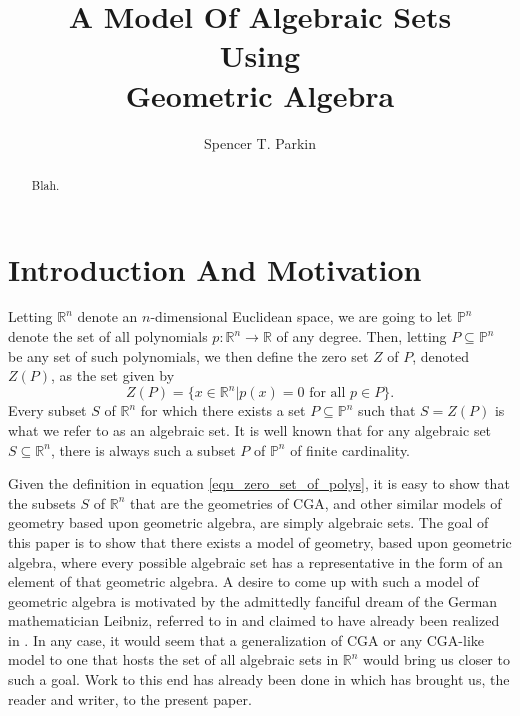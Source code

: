 \documentclass{birkjour}
\theoremstyle{definition}
\theoremstyle{remark}
\numberwithin{equation}{section}
\newcommand{\R}{\mathbb{R}}
\newcommand{\Poly}{\mathbb{P}}
\begin{document}
\title{A Model Of Algebraic Sets\\Using\\Geometric Algebra}

\author{Spencer T. Parkin}





\begin{abstract}
Blah.
\end{abstract}

\maketitle

\section{Introduction And Motivation}

Letting $\R^n$ denote an $n$-dimensional Euclidean space, we are
going to let $\Poly^n$ denote the set of all polynomials $p:\R^n\to\R$
of any degree.  Then, letting $P\subseteq\Poly^n$ be any set of such
polynomials, we then define the zero set $Z$ of $P$, denoted $Z(P)$,
as the set given by
\begin{equation}\label{equ_zero_set_of_polys}
Z(P) = \{x\in\R^n|\mbox{$p(x)=0$ for all $p\in P$}\}.
\end{equation}
Every subset $S$ of $\R^n$ for which there exists a set $P\subseteq\Poly^n$
such that $S=Z(P)$ is what we refer to as an algebraic set.  It is well known
that for any algebraic set $S\subseteq\R^n$, there is always such a subset $P$
of $\Poly^n$ of finite cardinality.

Given the definition in equation \eqref{equ_zero_set_of_polys}, it is easy to show that
the subsets $S$ of $\R^n$ that are the geometries of
CGA, and other similar models of geometry based upon geometric algebra, are simply algebraic sets.
The goal of this paper is to show that there exists a model of geometry, based upon geometric algebra,
where every possible algebraic set has a representative in the form of an element of that geometric algebra.
A desire to come up with such a model of geometric algebra is motivated by the admittedly fanciful
dream of the German mathematician Leibniz, referred to in \cite{} and claimed to
have already been realized in \cite{}.  In any case, it would seem that a generalization
of CGA or any CGA-like model to one that hosts the set of all algebraic sets in $\R^n$ would bring
us closer to such a goal.  Work to this end has already been done in \cite{Parkin13a,Parkin13b} which
has brought us, the reader and writer, to the present paper.
\end{document}
